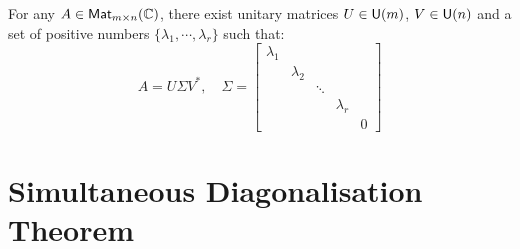 \begin{theorem}
	For any $A \in \operatorname{\text{\normalfont\sffamily Mat}}_{m \times n}(\operatorname{\mathbb{C}})$, there exist unitary matrices $U \in \operatorname{\text{\normalfont\sffamily U}}(m)$, $V \in \operatorname{\text{\normalfont\sffamily U}}(n)$ and a set of positive numbers $\{ \lambda_1, \cdots, \lambda_r \}$ such that:
	\[
		A = U \Sigma V^*, \quad \Sigma = \begin{bmatrix}
			\lambda_1 &           &        &           &   \\
			          & \lambda_2 &        &           &   \\
			          &           & \ddots &           &   \\
			          &           &        & \lambda_r &   \\
			          &           &        &           & 0
		\end{bmatrix}
	\]
\end{theorem}



\section{Simultaneous Diagonalisation Theorem}

